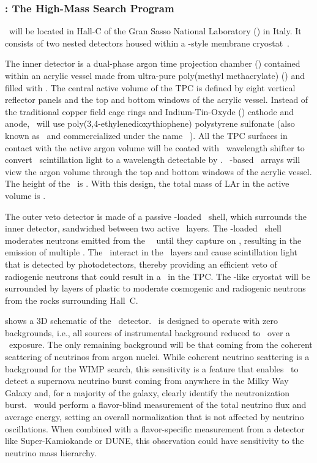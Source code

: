 \subsubsection{\DSk: The High-Mass Search Program}
\label{sec:DSk}

\DSks\ will be located in Hall-C of the Gran Sasso National Laboratory (\LNGS) in Italy. It consists of two nested detectors housed within a \pDUNE-style membrane cryostat~\cite{Abi:2017wp,Acciarri:2016wz}.  

The inner detector is a dual-phase argon time projection chamber (\LArTPC) contained within an acrylic vessel made from ultra-pure poly(methyl methacrylate) (\PMMA) and filled with \UAr.  The central active volume of the TPC is defined by eight vertical reflector panels and the top and bottom windows of the acrylic vessel. Instead of the traditional copper field cage rings and Indium-Tin-Oxyde (\ITO) cathode and anode, \DSks\ will use poly(3,4-ethylenedioxythiophene) polystyrene sulfonate (also known as \PEDOT\ and commercialized under the name \Clevios~\cite{HeraeusDeutschlandGmbHandCOKg:2019wt}). All the TPC surfaces in contact with the active argon volume will be coated with \TPB\ wavelength shifter to convert \LAr\ scintillation light to a wavelength detectable by \SiPMs.  \DSkTilesNumber\ \SiPM-based \DSkPdm\ arrays will view the argon volume through the top and bottom windows of the acrylic vessel. The height of the \TPC\ is \DSkTPCHeight. With this design, the total mass of LAr in the active volume is \DSkActiveMass.

The outer veto detector is made of a passive -loaded \PMMA\ shell, which surrounds the inner detector, sandwiched between two active \AAr\ layers.  The -loaded \PMMA\ shell moderates neutrons emitted from the \LAr\ \TPC\ until they capture on , resulting in the emission of multiple \grs.  The \grs\ interact in the \AAr\ layers and cause scintillation light that is detected by photodetectors, thereby providing an efficient veto of radiogenic neutrons that could result in a \NR\ in the TPC.  The \pDUNE-like cryostat will be surrounded by layers of plastic to moderate cosmogenic and radiogenic neutrons from the rocks surrounding Hall~C.

 shows a 3D schematic of the \DSks\ detector. \DSks\ is designed to operate with zero backgrounds, i.e., all sources of instrumental background reduced to \BackgroundFreeRequirement\ over a \DSkExposure\ exposure.  The only remaining background will be that coming from the coherent scattering of neutrinos from argon nuclei. While coherent neutrino scattering is a background for the WIMP search, this sensitivity is a feature that enables \DSks\ to detect a supernova neutrino burst coming from anywhere in the Milky Way Galaxy and, for a majority of the galaxy, clearly identify the neutronization burst. \DSks\ would perform a flavor-blind measurement of the total neutrino flux and average energy, setting an overall normalization that is not affected by neutrino oscillations. When combined with a flavor-specific measurement from a detector like Super-Kamiokande or DUNE, this observation could have sensitivity to the neutrino mass hierarchy.  

